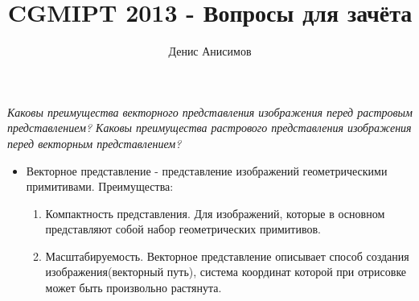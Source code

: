 \documentclass[11pt]{article}
\title{CGMIPT 2013 - Вопросы для зачёта}
\author{Денис Анисимов}
\begin{document}
\maketitle
\section{}
\textit{Каковы преимущества векторного представления изображения перед растровым представлением? Каковы преимущества растрового представления изображения перед векторным представлением?}

\begin{itemize}
  \item Векторное представление - представление изображений геометрическими примитивами. Преимущества:
  \begin{enumerate}
    \item Компактность представления. Для изображений, которые в основном представляют собой набор геометрических примитивов.
    \item Масштабируемость. Векторное представление описывает способ создания изображения(векторный путь), система координат которой при отрисовке может быть произвольно растянута.
    

\end{enumerate}
\end{itemize}
\end{document}
